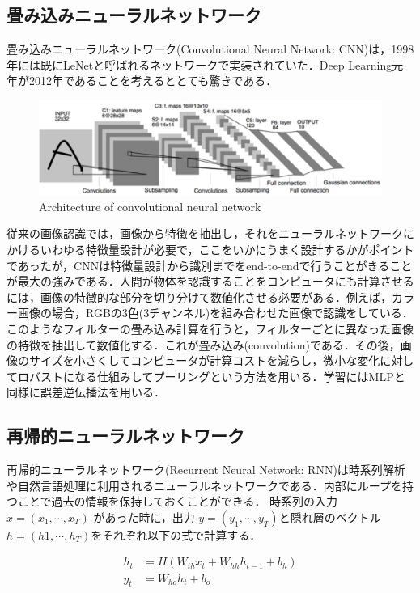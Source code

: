 \subsection{畳み込みニューラルネットワーク}
畳み込みニューラルネットワーク(Convolutional Neural Network: CNN)は，1998年には既にLeNetと呼ばれるネットワークで実装されていた\cite{LeNet}．Deep Learning元年が2012年であることを考えるととても驚きである．
\begin{figure}
	\centering
	\includegraphics[width=0.7\linewidth]{fig/LeNet}
	\caption{Architecture of convolutional neural network\cite{LeNet}}
	\label{fig:LeNet}
\end{figure}
従来の画像認識では，画像から特徴を抽出し，それをニューラルネットワークにかけるいわゆる特徴量設計が必要で，ここをいかにうまく設計するかがポイントであったが，CNNは特徴量設計から識別までをend-to-endで行うことがきることが最大の強みである．人間が物体を認識することをコンピュータにも計算させるには，画像の特徴的な部分を切り分けて数値化させる必要がある．例えば，カラー画像の場合，RGBの3色(3チャンネル)を組み合わせた画像で認識をしている．このようなフィルターの畳み込み計算を行うと，フィルターごとに異なった画像の特徴を抽出して数値化する．これが畳み込み(convolution)である．その後，画像のサイズを小さくしてコンピュータが計算コストを減らし，微小な変化に対してロバストになる仕組みしてプーリングという方法を用いる．学習にはMLPと同様に誤差逆伝播法を用いる．


\subsection{再帰的ニューラルネットワーク}
再帰的ニューラルネットワーク(Recurrent Neural Network: RNN)は時系列解析や自然言語処理に利用されるニューラルネットワークである．内部にループを持つことで過去の情報を保持しておくことができる．
時系列の入力 $x = (x_1, \cdots , x_T)$ があった時に，出力 $y = (y_1, \cdots , y_T)$と隠れ層のベクトル $h = (h1, \cdots ,h_T)$をそれぞれ以下の式で計算する．

\begin{align}
\label{eq:RNN}
  h_t & = H(W_{ih} x_t + W_{hh} h_{t-1} + b_h) \\ 
  y_t & = W_{ho} h_t + b_o
\end{align}

